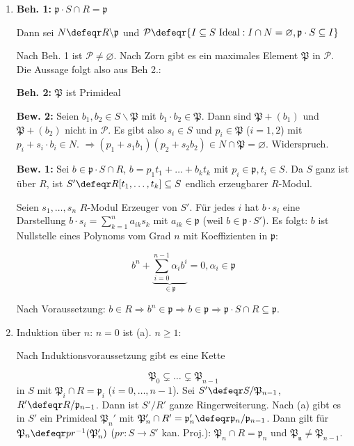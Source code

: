 \begin{Bew}
\begin{enumerate}
\item \textbf{Beh. 1: } $\mathfrak{p}\cdot S \cap R =\mathfrak{p}$

Dann sei $N\defeqr R\backslash\mathfrak{p}$ und $\mathcal{P}\defeqr
\{I\subseteq S\ \text{Ideal}: I\cap N=\varnothing, \mathfrak{p}\cdot S \subseteq I\}$

Nach Beh. 1 ist $\mathcal{P}\neq \varnothing$. Nach Zorn gibt es ein maximales Element
$\mathfrak{P}$ in $\mathcal{P}$. Die Aussage folgt also aus Beh 2.:

\textbf{Beh. 2: } $\mathfrak{P}$ ist Primideal

\textbf{Bew. 2: } Seien $b_1, b_2\in S\backslash \mathfrak{P}$ mit $b_1\cdot b_2\in \mathfrak{P}$.
Dann sind $\mathfrak{P}+(b_1)$ und $\mathfrak{P}+(b_2)$ nicht in $\mathcal{P}$. Es gibt
also $s_i\in S$ und $p_i\in \mathfrak{P}$ ($i=1,2$) mit $p_i+s_i\cdot b_i\in N$.
$\Rightarrow (p_1+s_1b_1)(p_2+s_2b_2)\in N\cap \mathfrak{P}=\varnothing$. Widerspruch.

\textbf{Bew. 1: } Sei $b\in \mathfrak{p}\cdot S\cap R$, $b=p_1t_1+\ldots+b_k t_k$ mit 
$p_i\in \mathfrak{p}, t_i\in S$. Da $S$ ganz ist \"uber $R$, ist 
$S'\defeqr R[t_1, \ldots, t_k]\subseteq S$ endlich erzeugbarer $R$-Modul.

Seien $s_1,\ldots, s_n$ $R$-Modul Erzeuger von $S'$. F\"ur jedes $i$ hat $b\cdot s_i$ eine
Darstellung $b\cdot s_i=\sum_{k=1}^{n}a_{ik}s_k$ mit $a_{ik}\in \mathfrak{p}$
(weil $b\in \mathfrak{p}\cdot S'$). Es folgt: $b$ ist Nullstelle eines Polynoms
vom Grad $n$ mit Koeffizienten in $\mathfrak{p}$: 

$$b^n+ \underbrace{\sum_{i=0}^{n-1}\alpha_i b^i}_{\in \mathfrak{p}}=0, \alpha_i\in \mathfrak{p}$$

Nach Voraussetzung: $b\in R\Rightarrow b^n\in \mathfrak{p}\Rightarrow b\in \mathfrak{p}
\Rightarrow \mathfrak{p}\cdot S \cap R\subseteq \mathfrak{p}$.

\item Induktion \"uber $n$: $n=0$ ist (a). $n\geq 1$:

Nach Induktionsvoraussetzung gibt es eine Kette

$$\mathfrak{P}_0\subsetneq\ldots\subsetneq\mathfrak{P}_{n-1}$$ 
in $S$ mit $\mathfrak{P}_i\cap R=\mathfrak{p}_i$ ($i=0,\ldots, n-1$). Sei
$S'\defeqr S/\mathfrak{P}_{n-1}$, $R'\defeqr R/\mathfrak{p}_{n-1}$. Dann 
ist $S'/R'$ ganze Ringerweiterung. Nach (a) gibt es in $S'$ ein Primideal $\mathfrak{P}_{n}'$
mit $\mathfrak{P}_n'\cap R'=\mathfrak{p}_n'\defeqr \mathfrak{p}_n/\mathfrak{p}_{n-1}$.
Dann gilt f\"ur $\mathfrak{P}_n\defeqr pr^{-1}(\mathfrak{P}_n')$ ($pr:S\to S'$ kan. Proj.):
$\mathfrak{P}_n\cap R=\mathfrak{p}_n$ und $\mathfrak{P_n}\neq\mathfrak{P}_{n-1}$.


\end{enumerate}
\end{Bew}
